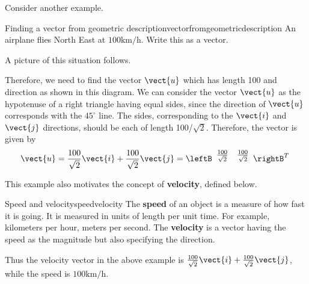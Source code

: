 Consider another example.

\begin{example}{Finding a vector from geometric description}{vectorfromgeometricdescription}
An airplane flies North East at $100\textrm{km}/\textrm{h}$. Write this as a vector.
\end{example}

\begin{solution}
A picture of this situation follows.

\begin{center}
\end{center}

Therefore, we need to find the vector $\vect{u}$ which has length 100 and direction as shown in this diagram. 
We can consider the vector $\vect{u}$ as the hypotenuse of a
right triangle having equal sides, since the direction of $\vect{u}$ corresponds with the $45 ^{\circ}$ line. 
The sides, corresponding to the $\vect{i}$ and $\vect{j}$ directions,  should be each of length 100/$
\sqrt{2}.$ Therefore, the vector is given by 
\[
 \vect{u} = \frac{100}{\sqrt{2}} \vect{i}+ \frac{100}{\sqrt{2
}}\vect{j}
=
\leftB
\begin{array}{rr}
\vspace{0.05in} \frac{100}{\sqrt{2}} & \vspace{0.05in}\frac{100}{\sqrt{2}}
\end{array}
\rightB^T\
\]
\end{solution}

This example also motivates the concept of \textbf{velocity}, defined below.

\begin{definition}{Speed and velocity}{speedvelocity}
The \textbf{speed} of an object is a measure of how fast it is going. It is
measured in units of length per unit time. For example, kilometers per
hour, meters per second. The
\textbf{velocity} is a vector having the speed as the
magnitude but also specifying the direction.
\end{definition}

Thus the velocity vector in the above example is $\vspace{0.05in}\frac{100}{\sqrt{2}}\vect{i}+
\vspace{0.05in}\frac{100}{\sqrt{2}}\vect{j}$, while the speed is $100\textrm{km}/\textrm{h}$.

